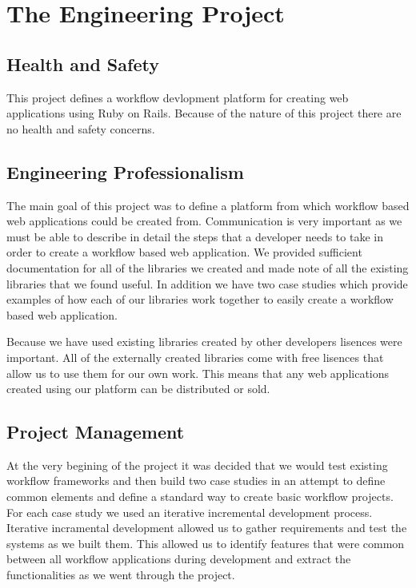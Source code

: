 \documentclass[document.tex]{subfiles}
\begin{document}
\chapter{The Engineering Project}
\label {ch:engineering}

\section{Health and Safety}

This project defines a workflow devlopment platform for creating web applications using Ruby on Rails. Because of the nature of this project there are no health and safety concerns.

\section{Engineering Professionalism}

The main goal of this project was to define a platform from which workflow based web applications could be created from. Communication is very important as we must be able to describe in detail the steps that a developer needs to take in order to create a workflow based web application. We provided sufficient documentation for all of the libraries we created and made note of all the existing libraries that we found useful. In addition we have two case studies which provide examples of how each of our libraries work together to easily create a workflow based web application.

Because we have used existing libraries created by other developers lisences were important. All of the externally created libraries come with free lisences that allow us to use them for our own work. This means that any web applications created using our platform can be distributed or sold.

\section{Project Management}

At the very begining of the project it was decided that we would test existing workflow frameworks and then build two case studies in an attempt to define common elements and define a standard way to create basic workflow projects. For each case study we used an iterative incremental development process. Iterative incramental development allowed us to gather requirements and test the systems as we built them. This allowed us to identify features that were common between all workflow applications during development and extract the functionalities as we went through the project.
\end{document}
